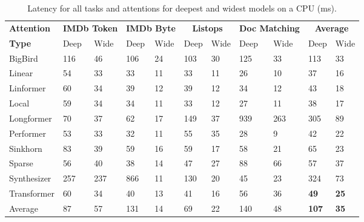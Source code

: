 \begin{table}[!h]
    \caption{Latency for all tasks and attentions for deepest and widest models on a CPU (ms).}
    \label{table:cpu_latency}
    \begin{center}
        \begin{tabular}{l | l l l l l l l l | l l}
            \toprule
            {\bf Attention} & \multicolumn{2}{c}{\bf IMDb Token} & \multicolumn{2}{c}{\bf IMDb Byte} & \multicolumn{2}{c}{\bf Listops} & \multicolumn{2}{c}{\bf Doc Matching} & \multicolumn{2}{c}{\bf Average} \\
            {\bf Type} & Deep & Wide & Deep & Wide & Deep & Wide & Deep & Wide & Deep & Wide \\
            \midrule
BigBird     & 116 & 46 & 106 & 24 & 103 & 30 & 125 & 33 & 113 & 33 \\
Linear      & 54 & 33 & 33 & 11 & 33 & 11 & 26 & 10 & 37 & 16 \\
Linformer   & 60 & 34 & 39 & 12 & 39 & 12 & 34 & 12 & 43 & 18 \\
Local       & 59 & 34 & 34 & 11 & 33 & 12 & 27 & 11 & 38 & 17 \\
Longformer  & 70 & 37 & 62 & 17 & 149 & 37 & 939 & 263 & 305 & 89 \\
Performer   & 53 & 33 & 32 & 11 & 55 & 35 & 28 & 9 & 42 & 22 \\
Sinkhorn    & 83 & 39 & 59 & 16 & 59 & 17 & 58 & 21 & 65 & 23 \\
Sparse      & 56 & 40 & 38 & 14 & 47 & 27 & 88 & 66 & 57 & 37 \\
Synthesizer & 257 & 237 & 866 & 11 & 130 & 20 & 45 & 23 & 324 & 73 \\
Transformer & 60 & 34 & 40 & 13 & 41 & 16 & 56 & 36 & \textbf{49} & \textbf{25}  \\
\bottomrule
Average     & 87 & 57 & 131 & 14 & 69 & 22 & 140 & 48 & \textbf{107} & \textbf{35} \\
        \end{tabular}
    \end{center}
\end{table}

